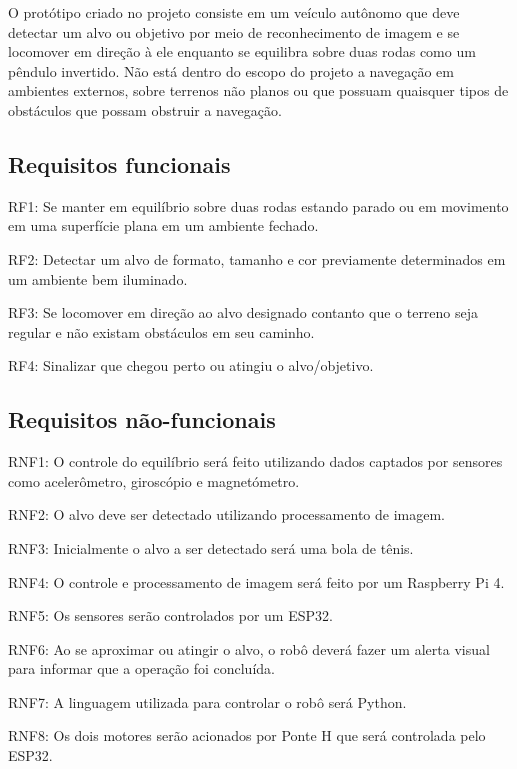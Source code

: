 O protótipo criado no projeto consiste em um veículo autônomo que deve detectar um alvo ou objetivo por meio de reconhecimento de imagem e se locomover em direção à ele enquanto se equilibra sobre duas rodas como um pêndulo invertido.
Não está dentro do escopo do projeto a navegação em ambientes externos, sobre terrenos não planos ou que possuam quaisquer tipos de obstáculos que possam obstruir a navegação.

\subsection{Requisitos funcionais}

RF1: Se manter em equilíbrio sobre duas rodas estando parado ou em movimento em uma superfície plana em um ambiente fechado.

RF2: Detectar um alvo de formato, tamanho e cor previamente determinados em um ambiente bem iluminado.

RF3: Se locomover em direção ao alvo designado contanto que o terreno seja regular e não existam obstáculos em seu caminho.

RF4: Sinalizar que chegou perto ou atingiu o alvo/objetivo.


\subsection{Requisitos não-funcionais}

RNF1: O controle do equilíbrio será feito utilizando dados captados por sensores como acelerômetro, giroscópio e magnetómetro.

RNF2: O alvo deve ser detectado utilizando processamento de imagem.

RNF3: Inicialmente o alvo a ser detectado será uma bola de tênis.

RNF4: O controle e processamento de imagem será feito por um Raspberry Pi 4.

RNF5: Os sensores serão controlados por um ESP32.

RNF6: Ao se aproximar ou atingir o alvo, o robô deverá fazer um alerta visual para informar que a operação foi concluída.

RNF7: A linguagem utilizada para controlar o robô será Python.

RNF8: Os dois motores serão acionados por Ponte H que será controlada pelo ESP32.

